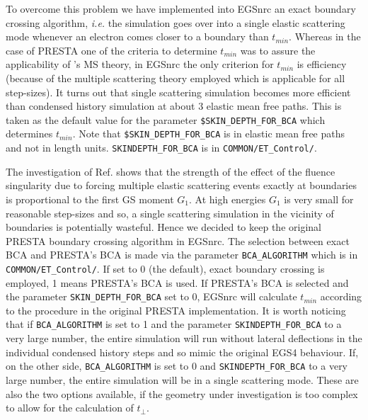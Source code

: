 To overcome this problem we have implemented into EGSnrc an
exact boundary crossing algorithm, {\em i.e.} the simulation
goes over into a single elastic scattering mode whenever
an electron comes closer to a
boundary than $t_{min}$.
Whereas in the case of PRESTA one of
the criteria to determine $t_{min}$ was to assure the
applicability of \Mol's MS theory, in EGSnrc the only criterion
for $t_{min}$ is efficiency (because of the multiple scattering theory
employed which is applicable for all step-sizes). It turns out that single
scattering simulation becomes more efficient than condensed history
simulation at about
3 elastic mean free paths. This is taken as the default value
for the parameter {\tt \$SKIN\_DEPTH\_FOR\_BCA} which determines
$t_{min}$. Note that {\tt \$SKIN\_DEPTH\_FOR\_BCA} is in
elastic mean free paths and not in length units.
{\tt SKINDEPTH\_FOR\_BCA} is in {\tt COMMON/ET\_Control/}.

 
The investigation of Ref. \cite{Ka99b} shows that the
strength of the effect of the fluence singularity
due to forcing multiple elastic scattering events exactly
at boundaries is proportional to the first GS moment $G_1$.
At high energies $G_1$ is very small for reasonable step-sizes and
so, a single scattering simulation in the vicinity of
boundaries is potentially wasteful. Hence we decided to keep
the original PRESTA boundary crossing algorithm in EGSnrc. The selection
between exact BCA and PRESTA's BCA is made via the parameter
{\tt BCA\_ALGORITHM} which is in {\tt COMMON/ET\_Control/}.
If set to 0 (the default), exact boundary crossing is employed,
1 means PRESTA's BCA is used. If PRESTA's BCA is selected
and the parameter {\tt SKIN\_DEPTH\_FOR\_BCA} set to 0,
EGSnrc will calculate $t_{min}$ according to the procedure
in the original PRESTA implementation. It is worth noticing
that if {\tt BCA\_ALGORITHM} is set to 1 and the parameter
{\tt SKINDEPTH\_FOR\_BCA} to a very large number,
the entire simulation will run without lateral deflections
in the individual condensed history steps and so
mimic the original EGS4 behaviour. If, on the other side,
{\tt BCA\_ALGORITHM} is set to 0 and {\tt SKINDEPTH\_FOR\_BCA}
to a very large number, the entire simulation will be in
a single scattering mode. These are also the two options
available, if the geometry under investigation is
too complex to allow for the calculation of $t_\perp$.

